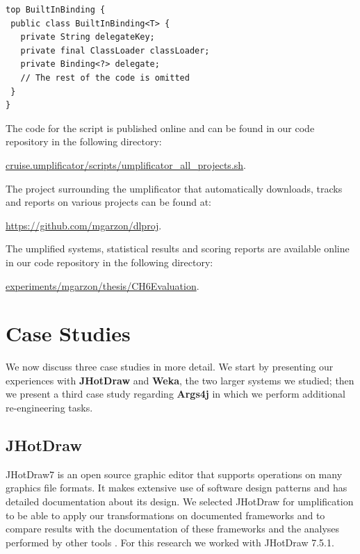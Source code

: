 \begin{lstlisting}[style=umpleIn, caption=BuiltInBinding.ump using the Top construct, label=lst:genericUmplifiedTop]
top BuiltInBinding {
 public class BuiltInBinding<T> {
   private String delegateKey;
   private final ClassLoader classLoader;
   private Binding<?> delegate;
   // The rest of the code is omitted
 }
}
\end{lstlisting}

The code for the script is published online and can be found in our code repository \cite{umpleRepository} in the following directory:

\url{cruise.umplificator/scripts/umplificator_all_projects.sh}.

The project surrounding the umplificator that automatically downloads, tracks and reports on various projects can be found at: 

\url{https://github.com/mgarzon/dlproj}.


The umplified systems, statistical results and scoring reports are available online in our code repository \cite{umpleRepository} in the following directory:

\url{experiments/mgarzon/thesis/CH6Evaluation}.


\section{Case Studies}
\label{sec:6CaseStudies}

We now discuss three case studies in more detail. We start by presenting our experiences with \textbf{JHotDraw} and \textbf{Weka}, the two larger systems we studied; then we present a third case study regarding \textbf{Args4j} in which we perform additional re-engineering tasks.

\subsection{JHotDraw}
 
JHotDraw7 \cite{jhotdraw} is an open source graphic editor that supports operations on many graphics file formats. It makes extensive use of software design patterns and has detailed documentation about its design. We selected JHotDraw for umplification to be able to apply our transformations on documented frameworks and to compare results with the documentation of these frameworks and the analyses performed by other tools \cite{jhotdraw}. For this research we worked with JHotDraw 7.5.1.

